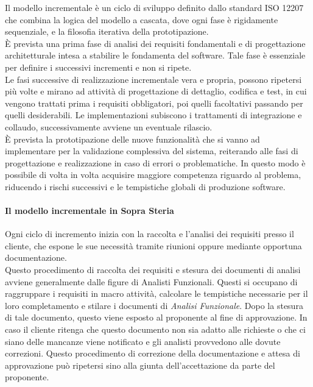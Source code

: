 	Il modello incrementale è un ciclo di sviluppo definito dallo standard ISO 12207 che combina la logica del modello a cascata, dove ogni fase è rigidamente sequenziale, e la filosofia iterativa della prototipazione.\\
	
	È prevista una prima fase di analisi dei requisiti fondamentali e di progettazione architetturale intesa a stabilire le fondamenta del software. Tale fase è essenziale per definire i successivi incrementi e non si ripete.\\
	
	Le fasi successive di realizzazione incrementale vera e propria, possono ripetersi più volte e mirano ad attività di progettazione di dettaglio, codifica e test, in cui vengono trattati prima i requisiti obbligatori, poi quelli facoltativi passando per quelli desiderabili. Le implementazioni subiscono i trattamenti di integrazione e collaudo, successivamente avviene un eventuale rilascio.\\

	È prevista la prototipazione delle nuove funzionalità che si vanno ad implementare per la validazione complessiva del sistema, reiterando 
	alle fasi di progettazione e realizzazione in caso di errori o problematiche. In questo modo è possibile di volta in volta acquisire maggiore competenza riguardo al problema, riducendo i rischi successivi e le tempistiche globali di produzione software.
	
	\paragraph{Il modello incrementale in Sopra Steria}
\leavevmode	\newline \newline
	Ogni ciclo di incremento inizia con la raccolta e l'analisi dei requisiti presso il cliente, che espone le sue necessità tramite riunioni oppure mediante opportuna documentazione.\\
	
	Questo procedimento di raccolta dei requisiti e stesura dei documenti di analisi avviene generalmente dalle figure di Analisti Funzionali. Questi si occupano di raggruppare i requisiti in macro attività, calcolare le tempistiche necessarie per il loro completamento e stilare i documenti di \textit{Analisi Funzionale}. Dopo la stesura di tale documento, questo viene esposto al proponente al fine di approvazione. In caso il cliente ritenga che questo documento non sia adatto alle richieste o che ci siano delle mancanze viene notificato e gli analisti provvedono alle dovute correzioni. Questo procedimento di correzione della documentazione e attesa di approvazione può ripetersi sino alla giunta dell'accettazione da parte del proponente.\\
	
